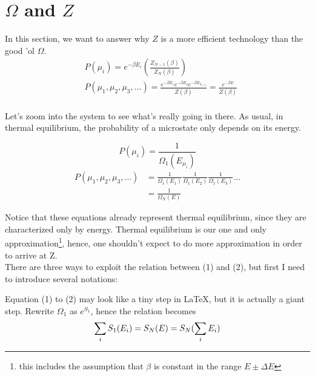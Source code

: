 




    \section{\mathsection $\Omega$ and $Z$}
    \newcommand{\ThE}{thermal equilibrium}
        
        In this section, we want to answer why $Z$ is a more efficient technology than the good 'ol $\Omega$.
        \begin{align*}
            &P(\mu_i) = e^{-\beta E_i}
            \left( \frac{Z_{N-1}(\beta)}{Z_N(\beta)}\right)\\
            &P(\mu_1,\mu_2,\mu_3,\ldots) = \frac{e^{-\beta E_1} e^{-\beta E_2} e^{-\beta E_3} \cdots}{Z(\beta)}
                              = \frac{e^{-\beta E} }{Z(\beta)}\\
        \end{align*}

        Let's zoom into the system to see what's really going in there.
        As usual, in \ThE, the probability of a microstate only depends on its energy.

            \[P(\mu_i) = \frac1{\Omega_1(E_{\mu_i})} \]
        \begin{align}
            P(\mu_1,\mu_2,\mu_3,\ldots) &= \frac1{\Omega_1(E_1)}
                                \frac1{\Omega_1(E_2)}
                                \frac1{\Omega_1(E_3)}
                                \ldots \\
            &= \frac1{\Omega_N(E)}
        \end{align}

        Notice that these equations already represent thermal equilibrium,
        since they are characterized only by energy.
        Thermal equilibrium is our one and only approximation\footnote{this includes the assumption that $\beta$ is constant in the range $E\pm\Delta E$},
        hence, one shouldn't expect to do more approximation in order to arrive at Z.\\
        There are three ways to exploit the relation between (1) and (2), but first I need to introduce several notations:

        \newcommand{\aE}{\epsilon}
        \newcommand{\soi}{\sum_i}
        \newcommand{\Stothei}[1] {{\hat\pdc}^{#1} S_1(\aE)}
        Equation (1) to (2) may look like a tiny step in \LaTeX,
        but it is actually a giant step.
        Rewrite $\Omega_1$ as $e^{ S_1}$, hence the relation becomes
        \begin{equation}
            \label{eq:mainassumption}
            \soi S_1(E_i) = S_N(E) = S_N(\soi E_i) \\
        \end{equation}


